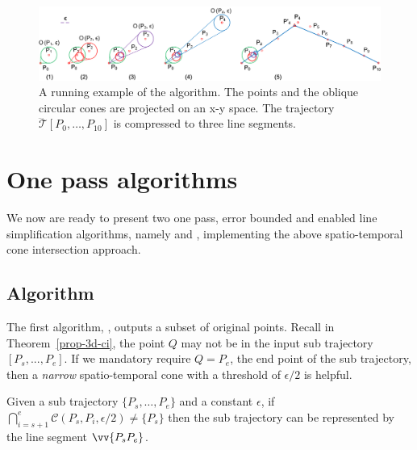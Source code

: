 
\begin{figure}[tb!]
\centering
\includegraphics[scale=0.8]{figures/Fig-conesta.png}
\vspace{-1ex}
\caption{\small A running example of the \cista algorithm. The points and the oblique circular cones are projected on an x-y space. The trajectory $\dddot{\mathcal{T}}[P_0, \ldots, P_{10}]$ is compressed to three line segments.}
\vspace{-2ex}
\label{fig:exm-consta}
\end{figure}


\section{One pass algorithms}
We now are ready to present two one pass, error bounded and \sed enabled line simplification algorithms, namely \cist and \cista, implementing the above spatio-temporal cone intersection approach.






\subsection{{Algorithm \cist}}
The first algorithm, \cist, outputs a subset of original points.
Recall in Theorem~\ref{prop-3d-ci}, the point $Q$ may not be in the input sub trajectory $[P_s,...,P_e]$.
If we mandatory require $Q=P_e$, the end point of the sub trajectory, then a \emph{narrow} spatio-temporal cone with a threshold of $\epsilon/2$ is helpful.

\begin{theorem}
\label{prop-3d-ci-half}
Given a sub trajectory $\{P_s, \ldots, P_e\}$ and a constant $\epsilon$, if $\bigcap_{i=s+1}^{e}{\mathcal{C}(P_s, P_i, \epsilon/2)} \ne \{P_s\}$ then the sub trajectory can be represented by the line segment $\vv{P_sP_e}$.
\end{theorem}

